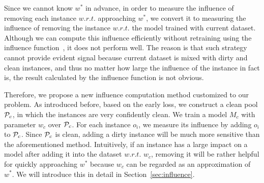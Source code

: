 Since we cannot know  $w^*$ in advance, in order to measure the influence of removing each instance $w.r.t.$ approaching  $w^*$, we  convert it to  measuring the influence of removing the instance $w.r.t.$ the model trained with current dataset. Although we can compute this influence efficiently without retraining using the influence function~\cite{}, it does not perform well. The reason is that  such strategy cannot provide evident signal because current dataset is mixed with dirty and clean instances, and thus no matter how large the influence of the instance in fact is, the  result  calculated by the influence function is not obvious.

Therefore, we propose a new influence computation method customized to our problem. As introduced before, based on the early loss,  we construct a clean pool $\mathcal{P}_c$, in which the instances are very confidently clean. We train a model $M_c$ with parameter $w_c$ over $\mathcal{P}_c$. For each instance $o_i$, we measure its influence by adding $o_i$ to $\mathcal{P}_c$. Since $\mathcal{P}_c$ is clean, adding a dirty instance will be much more sensitive than the aforementioned method.
Intuitively, if an instance has a large impact on a model after adding it into the dataset  $w.r.t.$  $w_c$, removing it will be rather helpful  for   quickly  approaching $w^*$ because $w_c$ can be regarded as an approximation of $w^*$. We will introduce this in detail in Section~\ref{sec:influence}.













